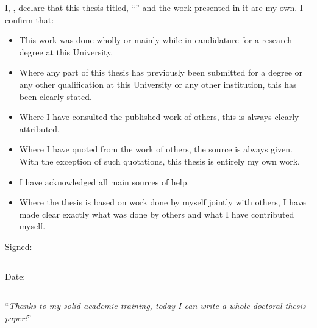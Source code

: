 \documentclass[
12pt, %
english, %
onehalfspacing, %
headsepline, %
]{MastersDoctoralThesis} %
\begin{document}

\begin{declaration}
\addchaptertocentry{\authorshipname}

\noindent I, \authorname, declare that this thesis titled, \enquote{\ttitle} and the work presented in it are my own. I confirm that:

\begin{itemize} 
\item This work was done wholly or mainly while in candidature for a research degree at this University.
\item Where any part of this thesis has previously been submitted for a degree or any other qualification at this University or any other institution, this has been clearly stated.
\item Where I have consulted the published work of others, this is always clearly attributed.
\item Where I have quoted from the work of others, the source is always given. With the exception of such quotations, this thesis is entirely my own work.
\item I have acknowledged all main sources of help.
\item Where the thesis is based on work done by myself jointly with others, I have made clear exactly what was done by others and what I have contributed myself.\\
\end{itemize}
 
\noindent Signed:\\
\rule[0.5em]{25em}{0.5pt} %
 
\noindent Date:\\
\rule[0.5em]{25em}{0.5pt} %
\end{declaration}

\cleardoublepage


\vspace*{0.2\textheight}

\noindent\enquote{\itshape Thanks to my solid academic training, today I can write a whole doctoral thesis paper!}\bigbreak
\end{document}
